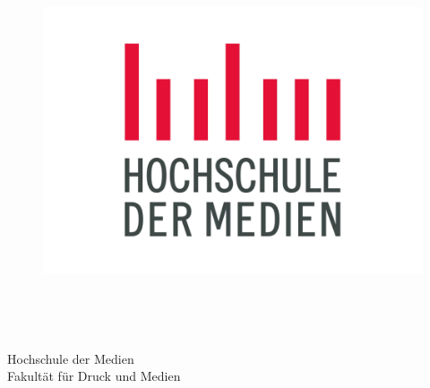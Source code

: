 \thispagestyle{empty}


\begin{figure}[t]
\begin{center}
 \includegraphics[scale=0.2]{abb/logo1}
\end{center}

~~~~~~~~~~
\end{figure}
\vspace{-2cm}

\begin{verbatim}


\end{verbatim}

\begin{center}
\Large{Hochschule der Medien}\\
\Large{Fakultät für Druck und Medien}\\
\end{center}


